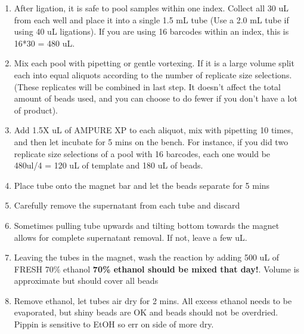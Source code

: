 \documentclass[11pt, oneside]{article}
\begin{document}
	\begin{enumerate}
		\item After ligation, it is safe to pool samples within one index. Collect all 30 uL from each well and place it into a single 1.5 mL tube (Use a 2.0 mL tube if using 40 uL ligations).  If you are using 16 barcodes within an index, this is 16*30 = 480 uL.  
		\item Mix each pool with pipetting or gentle vortexing.  If it is a large volume split each into equal aliquots according to the number of replicate size selections.  (These replicates will be combined in last step.  It doesn't affect the total amount of beads used, and you can choose to do fewer if you don't have a lot of product).
		\item Add 1.5X uL of AMPURE XP to each aliquot, mix with pipetting 10 times, and then let incubate for 5 mins on the bench.  For instance, if you did two replicate size selections of a pool with 16 barcodes, each one would be 480ul/4 = 120 uL of template and 180 uL of beads.
		\item Place tube onto the magnet bar and let the beads separate for 5 mins
		\item Carefully remove the supernatant from each tube and discard
		\item Sometimes pulling tube upwards and tilting bottom towards the magnet allows for complete supernatant removal. If not, leave a few uL.
		\item Leaving the tubes in the magnet, wash the reaction by adding 500 uL of FRESH 70\% ethanol {\bf 70\% ethanol should be mixed that day!}. Volume is approximate but should cover all beads
		\item Remove ethanol, let tubes air dry for 2 mins. All excess ethanol needs to be evaporated, but shiny beads are OK and beads should not be overdried. Pippin is sensitive to EtOH so err on side of more dry.


\end{enumerate}
\end{document}
